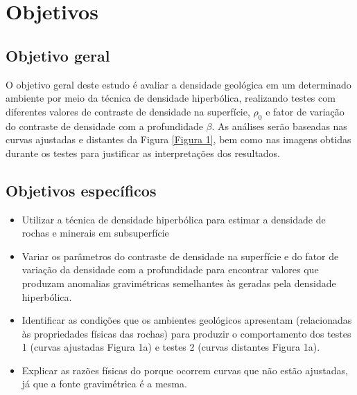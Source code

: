 \section{Objetivos}

    \subsection{Objetivo geral}
        O objetivo geral deste estudo é avaliar a densidade geológica em um determinado ambiente por meio da técnica de densidade hiperbólica, realizando testes com diferentes valores de contraste de
        densidade na superfície, $\rho_0$ e fator de variação do contraste de densidade com a profundidade $\beta$. As análises serão baseadas nas curvas ajustadas e distantes da Figura \ref{Figura 1}, bem como nas imagens obtidas durante os testes para justificar as interpretações dos resultados.
            \subsection{Objetivos específicos}
        \begin{itemize}
            \item Utilizar a técnica de densidade hiperbólica para estimar a densidade de rochas e minerais em subsuperfície 
            \item Variar os parâmetros do contraste de densidade na superfície e do fator de variação da densidade com a profundidade para encontrar valores que produzam anomalias gravimétricas semelhantes às geradas pela densidade hiperbólica.
            \item Identificar as condições que os ambientes geológicos apresentam (relacionadas às propriedades físicas das rochas) para produzir o comportamento dos testes 1 (curvas ajustadas Figura 1a) e testes 2 (curvas distantes Figura 1a).
            \item Explicar as razões físicas do porque ocorrem curvas que não estão ajustadas, já que a fonte gravimétrica é a mesma.
        \end{itemize}